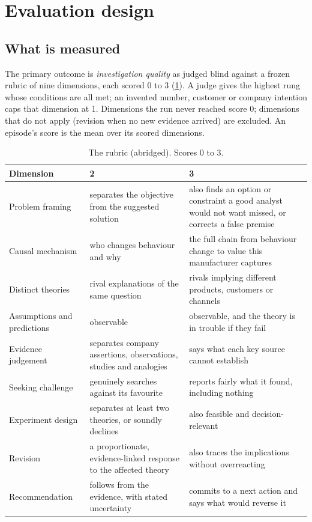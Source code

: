 \section{Evaluation design}\label{sec:eval}

\subsection{What is measured}
The primary outcome is \emph{investigation quality} as judged blind against a frozen rubric of nine dimensions, each
scored 0 to 3 (\cref{tab:rubric}). A judge gives the highest rung whose conditions are all met; an invented number,
customer or company intention caps that dimension at 1. Dimensions the run never reached score 0; dimensions that do not
apply (revision when no new evidence arrived) are excluded. An episode's score is the mean over its scored dimensions.

\begin{table}[H]\centering\footnotesize
\caption{The rubric (abridged). Scores 0 to 3.}\label{tab:rubric}
\begin{tabularx}{\linewidth}{@{}l X X@{}}
\toprule
Dimension & 2 & 3\\
\midrule
Problem framing & separates the objective from the suggested solution & also finds an option or constraint a good analyst would not want missed, or corrects a false premise\\
Causal mechanism & who changes behaviour and why & the full chain from behaviour change to value this manufacturer captures\\
Distinct theories & rival explanations of the same question & rivals implying different products, customers or channels\\
Assumptions and predictions & observable & observable, and the theory is in trouble if they fail\\
Evidence judgement & separates company assertions, observations, studies and analogies & says what each key source cannot establish\\
Seeking challenge & genuinely searches against its favourite & reports fairly what it found, including nothing\\
Experiment design & separates at least two theories, or soundly declines & also feasible and decision-relevant\\
Revision & a proportionate, evidence-linked response to the affected theory & also traces the implications without overreacting\\
Recommendation & follows from the evidence, with stated uncertainty & commits to a next action and says what would reverse it\\
\bottomrule
\end{tabularx}
\end{table}

